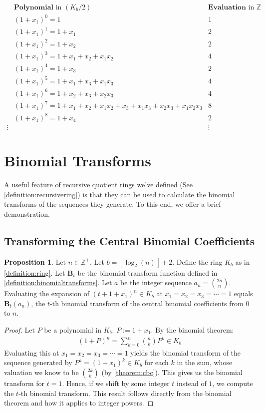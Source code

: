 \documentclass{article}
\theoremstyle{plain}
\theoremstyle{definition}
\newtheorem{proposition}{Proposition}
\newcommand{\floor}[1]{\left\lfloor #1 \right\rfloor}
\newcommand{\Z}{\mathbb{Z}}
\newcommand{\K}{K}
\newcommand{\BT}{\textbf{B}}
\begin{document}
\small
\begin{align*}
& \textbf{Polynomial} \text{ in } (\K_b/2) & \textbf{Evaluation} \text{ in } \Z \\ 
& (1+x_1)^0 = 1 & 1 \\
& (1+x_1)^1 = 1+x_1 & 2 \\
& (1+x_1)^2 = 1+x_2 & 2 \\
& (1+x_1)^3 = 1+x_1+x_2+x_1x_2 & 4 \\
& (1+x_1)^4 = 1+x_3 & 2 \\
& (1+x_1)^5 = 1+x_1+x_3+x_1x_3 & 4 \\
& (1+x_1)^6 = 1+x_2+x_3+x_2x_3 & 4 \\
& (1+x_1)^7 = 1+x_1+x_2+x_1x_2+x_3+x_1x_3+x_2x_3+x_1x_2x_3 & 8 \\
& (1+x_1)^8 = 1+x_4 & 2 \\
\vdots & & \vdots
\end{align*}
\normalsize

\section{Binomial Transforms}
A useful feature of recursive quotient rings we've defined (See \cref{definition:recursivering}) is that they can be used to calculate the binomial transforms of the sequences they generate. To this end, we offer a brief demonstration.

\subsection{Transforming the Central Binomial Coefficients}
\begin{proposition} \label{proposition:binomialtransforms}
Let $n \in \Z^+$. Let $b={\floor{\log_2(n)}+2}$. Define the ring $\K_b$ as in \cref{definition:ring}. Let $\BT_t$ be the binomial transform function defined in \cref{definition:binomialtransforms}. Let $a$ be the integer sequence $a_n=\binom{2n}{n}$. Evaluating the expansion of $(t + 1 + x_1)^n \in \K_b$ at $x_1=x_2=x_3=\cdots=1$ equals $\BT_t(a_n)$, the $t$-th binomial transform of the central binomial coefficients from $0$ to $n$.
\end{proposition}
\begin{proof}
Let $P$ be a polynomial in $\K_b$. $P := 1 + x_1$. By the binomial theorem:
\begin{align*}
    (1 + P)^n = \sum_{k=0}^{n} \binom{n}{k} P^k \in \K_b
\end{align*}
Evaluating this at $x_1=x_2=x_3=\cdots=1$ yields the binomial transform of the sequence generated by $P^k = (1 + x_1)^k \in \K_b$ for each $k$ in the sum, whose valuation we know to be $\binom{2k}{k}$ (by \cref{theorem:cbc}). This gives us the binomial transform for $t=1$. Hence, if we shift by some integer $t$ instead of $1$, we compute the $t$-th binomial transform. This result follows directly from the binomial theorem and how it applies to integer powers.
\end{proof}
\end{document}
